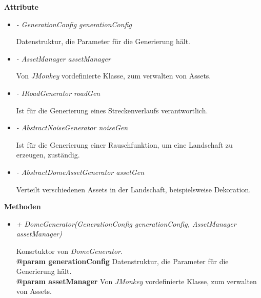             \textbf{Attribute}
            \begin{itemize}
                \item  \textit{- GenerationConfig generationConfig} 
                    \begin{leftbar}[0.9\linewidth]
                        Datenstruktur, die Parameter für die Generierung hält.
                    \end{leftbar}
                
                \item  \textit{- AssetManager assetManager} 
                    \begin{leftbar}[0.9\linewidth]
                        Von \textit{JMonkey} vordefinierte Klasse, zum verwalten von Assets.
                    \end{leftbar}
            
                \item  \textit{- IRoadGenerator roadGen} 
                    \begin{leftbar}[0.9\linewidth]
                        Ist für die Generierung eines Streckenverlaufs verantwortlich.
                    \end{leftbar}
                
                \item  \textit{- AbstractNoiseGenerator noiseGen} 
                    \begin{leftbar}[0.9\linewidth]
                        Ist für die Generierung einer Rauschfunktion, um eine Landschaft zu erzeugen, zuständig.
                    \end{leftbar}
                
                \item  \textit{- AbstractDomeAssetGenerator assetGen} 
                    \begin{leftbar}[0.9\linewidth]
                        Verteilt verschiedenen Assets in der Landschaft, beispielsweise Dekoration.
                    \end{leftbar}
            \end{itemize}

            \textbf{Methoden}					
            \begin{itemize}
                \item  \textit{+ DomeGenerator(GenerationConfig generationConfig, AssetManager assetManager)}
                    \begin{leftbar}[0.9\linewidth]
                        Konsrtuktor von \textit{DomeGenerator}.\\
                        \textbf{@param generationConfig} Datenstruktur, die Parameter für die Generierung hält.\\
                        \textbf{@param assetManager} Von \textit{JMonkey} vordefinierte Klasse, zum verwalten von Assets.
                    \end{leftbar}
            \end{itemize}
            
